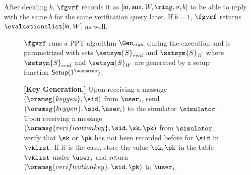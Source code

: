 After deciding $ b $, $ \fgvrf $ records it as $ [\msg, \aux, W,\ring,\sigma,b] $ to be able to reply with the same $ b $ for the same verification query later. If $ b = 1 $, $ \fgvrf $ returns $ \evaluationslist[\msg, W] $ as well.

\begin{figure}
	\begin{tcolorbox}[left=2pt,right=2pt]
	\small
		{  $ \fgvrf $ runs a PPT algorithm  $\Gen_{sign} $ during the execution and is parametrized with  sets $ \setsym{S}_{eval} $ and $ \setsym{S}_W $ where $ \setsym{S}_{eval} $ and $ \setsym{S}_W $ are generated by a setup function $ \mathsf{Setup}(1^\secparam) $.
	
		\textbf{[Key Generation.]} Upon receiving a message $(\oramsg{keygen}, \sid)$ from  $\user_i$, send $(\oramsg{keygen}, \sid, \user_i)$ to the simulator $\simulator$.
		Upon receiving a message $(\oramsg{verificationkey}, \allowbreak \sid, \sk,\pk)$ from $\simulator$, verify that $\sk $ or $\pk$ has not been recorded before for $ \sid $ in $ \vklist $. If it is the case, store  the value $\sk,\pk$ in the table $\vklist$ under $\user_i$ and return $(\oramsg{verificationkey}, \sid, \pk)$ to $ \user_i$.
			
			
}
\end{tcolorbox}
\end{figure}
